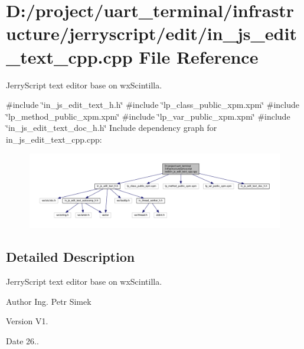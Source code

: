 \section{D\+:/project/uart\+\_\+terminal/infrastructure/jerryscript/edit/in\+\_\+js\+\_\+edit\+\_\+text\+\_\+cpp.cpp File Reference}
\label{in__js__edit__text__cpp_8cpp}


Jerry\+Script text editor base on wx\+Scintilla.  


{\ttfamily \#include \char`\"{}in\+\_\+js\+\_\+edit\+\_\+text\+\_\+h.\+h\char`\"{}}\newline
{\ttfamily \#include \char`\"{}lp\+\_\+class\+\_\+public\+\_\+xpm.\+xpm\char`\"{}}\newline
{\ttfamily \#include \char`\"{}lp\+\_\+method\+\_\+public\+\_\+xpm.\+xpm\char`\"{}}\newline
{\ttfamily \#include \char`\"{}lp\+\_\+var\+\_\+public\+\_\+xpm.\+xpm\char`\"{}}\newline
{\ttfamily \#include \char`\"{}in\+\_\+js\+\_\+edit\+\_\+text\+\_\+doc\+\_\+h.\+h\char`\"{}}\newline
Include dependency graph for in\+\_\+js\+\_\+edit\+\_\+text\+\_\+cpp.\+cpp\+:
\nopagebreak
\begin{figure}[H]
\begin{center}
\leavevmode
\includegraphics[width=350pt]{in__js__edit__text__cpp_8cpp__incl}
\end{center}
\end{figure}


\subsection{Detailed Description}
Jerry\+Script text editor base on wx\+Scintilla. 

\begin{DoxyAuthor}{Author}
Ing. Petr Simek 
\end{DoxyAuthor}
\begin{DoxyVersion}{Version}
V1. 
\end{DoxyVersion}
\begin{DoxyDate}{Date}
26.. 
\end{DoxyDate}
